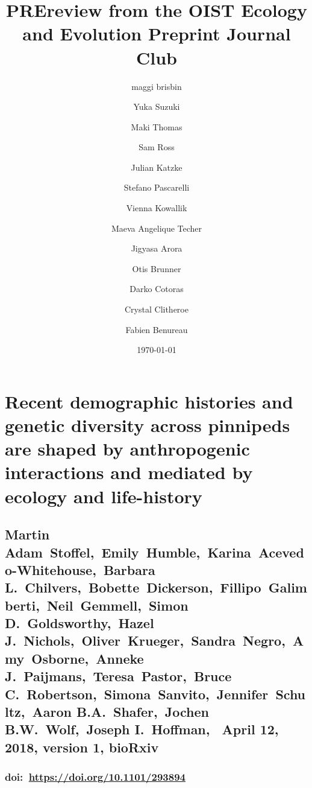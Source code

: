 \documentclass[10pt]{article}
\begin{document}
\title{PREreview from the OIST Ecology and Evolution Preprint Journal Club}



\author[1]{maggi brisbin}%
\author[1]{Yuka Suzuki}%
\author[1]{Maki Thomas}%
\author[1]{Sam Ross}%
\author[1]{Julian Katzke}%
\author[1]{Stefano Pascarelli}%
\author[1]{Vienna Kowallik}%
\author[1]{Maeva Angelique Techer}%
\author[1]{Jigyasa Arora}%
\author[1]{Otis Brunner}%
\author[1]{Darko Cotoras}%
\author[1]{Crystal Clitheroe}%
\author[1]{Fabien Benureau}%
%


\vspace{-1em}



  \date{\today}


\begingroup
\let\center\flushleft
\let\endcenter\endflushleft
\maketitle
\endgroup









\section*{Recent demographic histories and genetic diversity across
pinnipeds are shaped by anthropogenic interactions and mediated by
ecology and
life-history~~}

{\label{463319}}

\subsection*{Martin
Adam~Stoffel,~Emily~Humble,~Karina~Acevedo-Whitehouse,~Barbara
L.~Chilvers,~Bobette~Dickerson,~Fillipo~Galimberti,~Neil~Gemmell,~Simon
D.~Goldsworthy,~Hazel
J.~Nichols,~Oliver~Krueger,~Sandra~Negro,~Amy~Osborne,~Anneke
J.~Paijmans,~Teresa~Pastor,~Bruce
C.~Robertson,~Simona~Sanvito,~Jennifer~Schultz,~Aaron
B.A.~Shafer,~Jochen B.W.~Wolf,~Joseph I.~Hoffman,~ April 12, 2018,
version 1,
bioRxiv~}

{\label{720048}}

\subsubsection*{\texorpdfstring{doi:~\url{https://doi.org/10.1101/293894}}{doi:~https://doi.org/10.1101/293894}}
\end{document}
